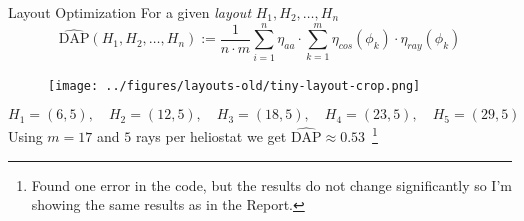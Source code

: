 \documentclass[10pt, xcolor={dvipsnames}]{beamer}
\begin{document}
\begin{frame}{Layout Optimization}
For a given {\it layout} $H_{1}, H_{2}, \dots, H_{n}$
\begin{equation}
\widehat{\text{DAP}}(H_{1}, H_{2}, \dots, H_{n}) := 
\frac{1}{n\cdot m}
\sum_{i = 1}^{n} \eta_{aa} \cdot
\sum_{k = 1}^{m} \eta_{cos}(\phi_{k}) \cdot 
\eta_{ray}(\phi_{k})
\end{equation}
\vspace{-.4cm}
\begin{center}
\begin{figure}
\texttt{[image: ../figures/layouts-old/tiny-layout-crop.png]}
\end{figure}
\end{center}
\vspace{-0.4cm}
\begin{example}
$$
H_1 = (6, 5), \quad 
H_2 = (12, 5), \quad
H_3 = (18, 5), \quad
H_4 = (23, 5), \quad
H_5 = (29, 5)
$$
Using $m = 17$ and $5$ rays per heliostat we get $\widehat{\text{DAP}} \approx 0.53$~\footnote{Found one error in the code, but the results do not change significantly so I'm showing the same results as in the Report.}
\end{example}
\end{frame}
\end{document}
